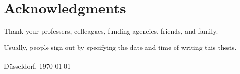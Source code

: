 \titleformat{\chapter}[hang]{\huge\bfseries}{\thechapter}{1em}{}
\titlespacing{\chapter}{0pt}{0pt}{1cm}

\chapter{Acknowledgments}

Thank your professors, colleagues, funding agencies, friends, and family.
\par
Usually, people sign out by specifying the date and time of writing this thesis.
\\\\
D\"usseldorf, \today
